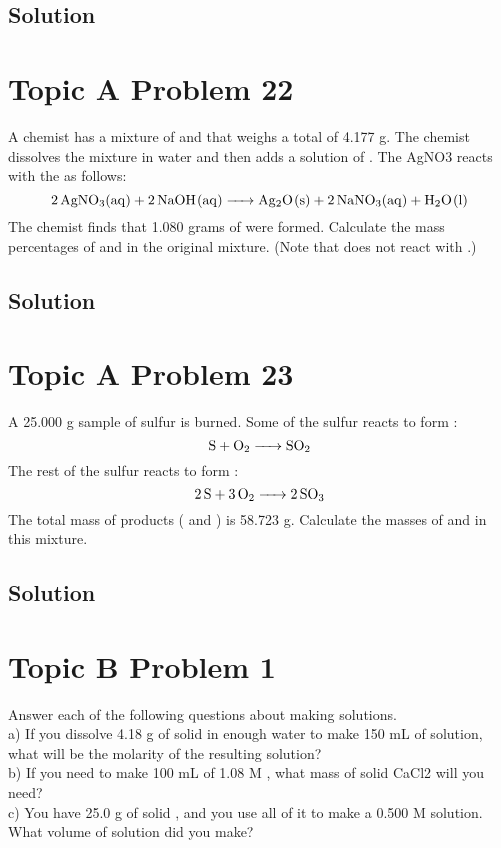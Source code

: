 \documentclass[10pt]{article}
\begin{document}
        \subsection{Solution}

    \pagebreak
    \section{Topic A Problem 22}
        A chemist has a mixture of  and  that weighs a total of 4.177 g. 
        The chemist dissolves the mixture in water and then adds a solution of . 
        The AgNO3 reacts with the  as follows:
        \begin{equation}
            \ce{2 AgNO3(aq) + 2 NaOH(aq) -> Ag2O(s) + 2 NaNO3(aq) + H2O(l)}
        \end{equation}
        The chemist finds that 1.080 grams of  were formed. 
        Calculate the mass percentages of  and  in the original mixture. 
        (Note that  does not react with .)

        \subsection{Solution}

    \pagebreak
    \section{Topic A Problem 23}
        A 25.000 g sample of sulfur is burned. 
        Some of the sulfur reacts to form :
        \begin{equation}
            \ce{S + O2 -> SO2}
        \end{equation}
        The rest of the sulfur reacts to form :
        \begin{equation}
            \ce{2 S + 3 O2 -> 2 SO3}
        \end{equation}
        The total mass of products ( and ) is 58.723 g. 
        Calculate the masses of  and  in this mixture.

        \subsection{Solution}

    \pagebreak
    \section{Topic B Problem 1}
        Answer each of the following questions about making solutions.\\
        a) If you dissolve 4.18 g of solid  in enough water to make 150 mL of solution, what will be the molarity of the resulting solution?\\
        b) If you need to make 100 mL of 1.08 M , what mass of solid CaCl2 will you need?\\
        c) You have 25.0 g of solid , and you use all of it to make a 0.500 M  solution. 
        What volume of solution did you make?
\end{document}
